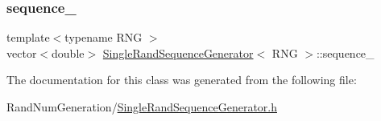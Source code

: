 \hypertarget{class_single_rand_sequence_generator_af886df7f0afc0d33da3472558856f0a0}{}\label{class_single_rand_sequence_generator_af886df7f0afc0d33da3472558856f0a0} 
\subsubsection{\texorpdfstring{sequence\+\_\+}{sequence\_}}
{\footnotesize\ttfamily template$<$typename R\+NG $>$ \\
vector$<$double$>$ \hyperlink{class_single_rand_sequence_generator}{Single\+Rand\+Sequence\+Generator}$<$ R\+NG $>$\+::sequence\+\_\+\hspace{0.3cm}{\ttfamily [private]}}



The documentation for this class was generated from the following file\+:\begin{DoxyCompactItemize}
\item 
Rand\+Num\+Generation/\hyperlink{_single_rand_sequence_generator_8h}{Single\+Rand\+Sequence\+Generator.\+h}\end{DoxyCompactItemize}
